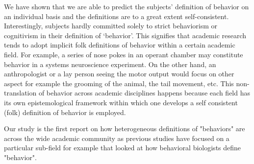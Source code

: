 \documentclass[a4paper, 11pt]{article}
\begin{document}
We have shown that we are able to predict the subjects' definition of behavior on an individual basis and the definitions are to a great extent self-consistent. Interestingly, subjects hardly committed solely to strict behaviorism or cognitivism in their definition of `behavior'. This signifies that academic research tends to adopt implicit folk definitions of behavior within a certain academic field. For example, a series of nose pokes in an operant chamber may constitute behavior in a systems neuroscience experiment. On the other hand, an anthropologist or a lay person seeing the motor output would focus on other aspect for example the grooming of the animal, the tail movement, etc. This non-translation of behavior across academic disciplines happens because each field has its own epistemological framework within which one develops a self consistent (folk) definition of behavior is employed. 

Our study is the first report on how heterogeneous definitions of "behaviors" are across the wide academic community as previous studies have focused on a particular sub-field for example \cite{levitis2009behavioural} that looked at how behavioral biologists define "behavior".

\end{document}
